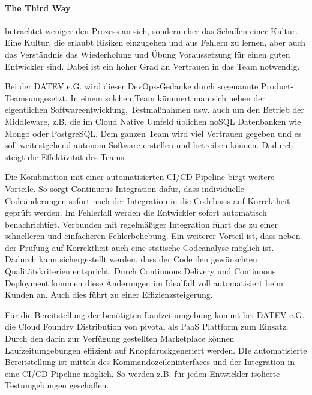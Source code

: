 \paragraph{\glqq The Third Way\grqq} betrachtet weniger den Prozess an sich, sondern eher das Schaffen einer Kultur.
Eine Kultur, die erlaubt Risiken einzugehen und aus Fehlern zu lernen, aber auch das Verständnis das Wiederholung und Übung Voraussetzung für einen guten Entwickler sind.
Dabei ist ein hoher Grad an Vertrauen in das Team notwendig.

Bei der DATEV e.G. wird dieser DevOps-Gedanke durch sogenannte \glqq Product-Teams\grqq umgesetzt.
In einem solchen Team kümmert man sich neben der eigentlichen Softwareentwicklung, Testmaßnahmen usw. auch um den Betrieb der Middleware, z.B. die im Cloud Native Umfeld üblichen noSQL Datenbanken wie Mongo oder PostgreSQL. 
Dem ganzen Team wird viel Vertrauen gegeben und es soll weitestgehend autonom Software erstellen und betreiben können.
Dadurch steigt die Effektivität des Teams.

Die Kombination mit einer automatisierten CI/CD-Pipeline birgt weitere Vorteile.
So sorgt Continuous Integration dafür, dass individuelle Codeänderungen sofort nach der Integration in die Codebasis auf Korrektheit geprüft werden.
Im Fehlerfall werden die Entwickler sofort automatisch benachrichtigt. 
Verbunden mit regelmäßiger Integration führt das zu einer schnelleren und einfacheren Fehlerbehebung.
Ein weiterer Vorteil ist, dass neben der Prüfung auf Korrektheit auch eine statische Codeanalyse möglich ist.
Dadurch kann sichergestellt werden, dass der Code den gewünschten Qualitätskriterien entspricht.
Durch Continuous Delivery und Continuous Deployment kommen diese Änderungen im Idealfall voll automatisiert beim Kunden an.
Auch dies führt  zu einer Effizienzsteigerung.

Für die Bereitstellung der benötigten Laufzeitumgebung kommt bei DATEV e.G. die Cloud Foundry Distribution von \glqq pivotal\grqq{} als PaaS Plattform zum Einsatz.
Durch den darin zur Verfügung gestellten \glqq Marketplace\grqq{} können Laufzeitumgebungen effizient \glqq auf Knopfdruck\grqq generiert werden.
DIe automatisierte Bereitstellung ist mittels des Kommandozeileninterfaces und der Integration in eine CI/CD-Pipeline möglich.
So werden z.B. für jeden Entwickler isolierte Testumgebungen geschaffen.

